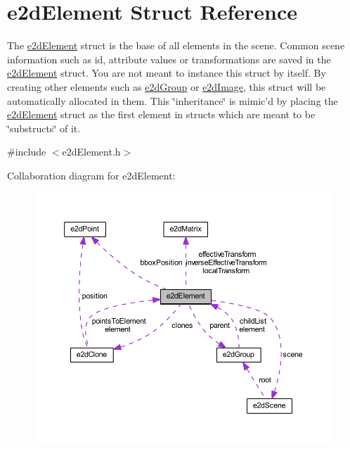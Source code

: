 \hypertarget{structe2dElement}{\section{e2d\-Element Struct Reference}
\label{structe2dElement}
}


The \hyperlink{structe2dElement}{e2d\-Element} struct is the base of all elements in the scene. Common scene information such as id, attribute values or transformations are saved in the \hyperlink{structe2dElement}{e2d\-Element} struct. You are not meant to instance this struct by itself. By creating other elements such as \hyperlink{structe2dGroup}{e2d\-Group} or \hyperlink{structe2dImage}{e2d\-Image}, this struct will be automatically allocated in them. This \char`\"{}inheritance\char`\"{} is mimic'd by placing the \hyperlink{structe2dElement}{e2d\-Element} struct as the first element in structs which are meant to be \char`\"{}substructs\char`\"{} of it.  




{\ttfamily \#include $<$e2d\-Element.\-h$>$}



Collaboration diagram for e2d\-Element\-:\nopagebreak
\begin{figure}[H]
\begin{center}
\leavevmode
\includegraphics[width=350pt]{structe2dElement__coll__graph}
\end{center}
\end{figure}
